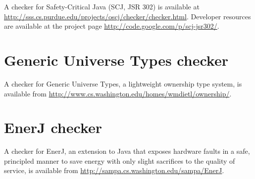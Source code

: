 A checker for Safety-Critical Java (SCJ, JSR 302) is available at
\url{http://sss.cs.purdue.edu/projects/oscj/checker/checker.html}.
Developer resources are available at the project page
\url{http://code.google.com/p/scj-jsr302/}.







\section{Generic Universe Types checker\label{gut-checker}}

A checker for Generic Universe Types, a lightweight ownership type
system, is available from
\url{http://www.cs.washington.edu/homes/wmdietl/ownership/}.


\section{EnerJ checker\label{enerj-checker}}

A checker for EnerJ, an extension to Java that exposes hardware faults
in a safe, principled manner to save energy with only
slight sacrifices to the quality of service, is available from
\url{http://sampa.cs.washington.edu/sampa/EnerJ}.


